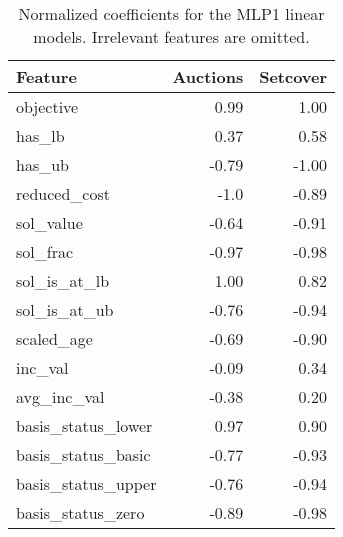 \begin{table}[ht]
	\centering
	\begin{tabular}{lrr}
		\toprule
		  \textbf{Feature} & \textbf{Auctions} & \textbf{Setcover}\\
		  \toprule
		  objective & 0.99 & 1.00 \\
		  has\_lb & 0.37 & 0.58\\
		  has\_ub & -0.79 & -1.00\\
		  reduced\_cost & -1.0 & -0.89\\
		  sol\_value & -0.64 & -0.91\\
          sol\_frac  & -0.97 & -0.98\\
		  sol\_is\_at\_lb & 1.00 & 0.82\\
		  sol\_is\_at\_ub & -0.76 & -0.94\\
		  scaled\_age & -0.69 & -0.90 \\
          inc\_val & -0.09 & 0.34\\
          avg\_inc\_val & -0.38 & 0.20\\
		  basis\_status\_lower & 0.97 & 0.90 \\
		  basis\_status\_basic & -0.77 & -0.93\\
		  basis\_status\_upper & -0.76 & -0.94 \\
		  basis\_status\_zero & -0.89 & -0.98 \\
		\bottomrule
	\end{tabular}
	\caption{\label{tab:coeffs}Normalized coefficients for the MLP1 linear models. Irrelevant features are omitted.}
\end{table}